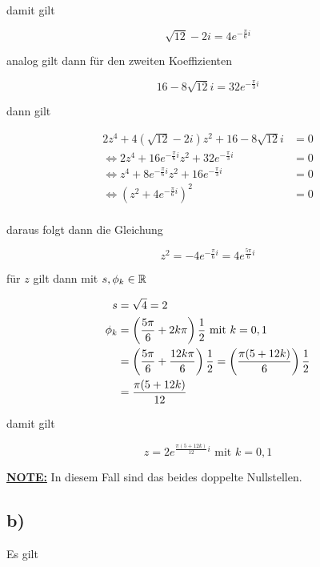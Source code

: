 \documentclass[a4paper, 11pt]{article}
\begin{document}
damit gilt

$$ \sqrt{12} - 2i = 4 e^{-\frac{\pi}{6}i} $$

analog gilt dann für den zweiten Koeffizienten

$$ 16 - 8\sqrt{12}i = 32 e^{-\frac{\pi}{3}i} $$

\pagebreak

dann gilt

\begin{align*}
    2z^4 + 4(\sqrt{12} - 2i)z^2 + 16 - 8\sqrt{12}i &= 0 \\
    \Leftrightarrow 2z^4 + 16 e^{-\frac{\pi}{6}i}z^2 + 32 e^{-\frac{\pi}{3}i} &= 0 \\
    \Leftrightarrow z^4 + 8 e^{-\frac{\pi}{6}i}z^2 + 16 e^{-\frac{\pi}{3}i} &= 0 \\
    \Leftrightarrow (z^2 + 4 e^{-\frac{\pi}{6}i})^2 &= 0 \\
\end{align*}

daraus folgt dann die Gleichung

$$ z^2 = -4 e^{-\frac{\pi}{6}i} = 4 e^{\frac{5\pi}{6}i} $$

für \(z\) gilt dann mit \(s, \phi_k \in \mathbb{R}\)

\begin{align*}
    s &= \sqrt{4} = 2 \\
    \phi_k &= \left(\frac{5 \pi}{6} + 2k\pi\right) \frac{1}{2} \text{ mit } k = 0, 1 \\
    &= \left(\frac{5 \pi}{6} + \frac{12k\pi}{6}\right) \frac{1}{2}
    = \left(\frac{\pi (5 + 12k)}{6}\right) \frac{1}{2} \\
    &= \frac{\pi (5 + 12k)}{12}
\end{align*}

damit gilt

$$ z = 2 e^{\frac{\pi (5 + 12k)}{12}i} \text{ mit } k = 0, 1 $$

\textbf{\uline{NOTE:}} In diesem Fall sind das beides doppelte Nullstellen.

\subsection{b)}
\label{sec:orga070297}
Es gilt
\end{document}
